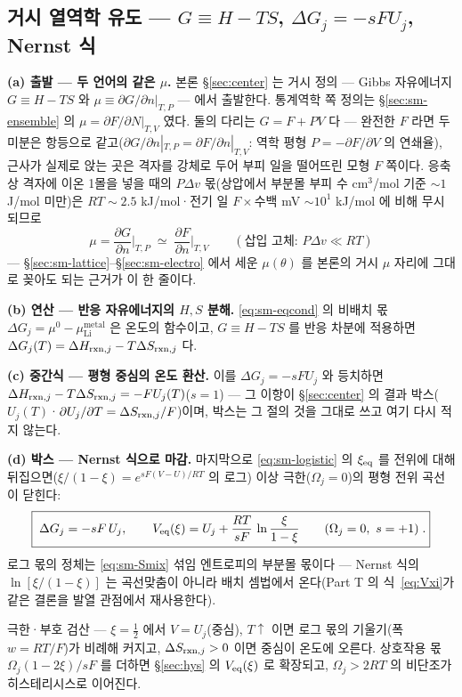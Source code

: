 \subsection{거시 열역학 유도 --- $G\equiv H-TS$, $\Delta G_j=-sFU_j$, Nernst 식}\label{sec:sm-macro}
\textbf{(a) 출발 --- 두 언어의 같은 $\mu$.} 본론 \S\ref{sec:center} 는 거시 정의 --- Gibbs 자유에너지
$G\equiv H-TS$ 와 $\mu\equiv\partial G/\partial n|_{T,P}$ --- 에서 출발한다. 통계역학 쪽 정의는
\S\ref{sec:sm-ensemble} 의 $\mu=\partial F/\partial N|_{T,V}$ 였다. 둘의 다리는 $G=F+PV$ 다 --- 완전한
$F$ 라면 두 미분은 항등으로 같고($\partial G/\partial n|_{T,P}=\partial F/\partial n|_{T,V}$: 역학 평형
$P=-\partial F/\partial V$ 의 연쇄율), 근사가 실제로 앉는 곳은 격자를 강체로 두어 부피 일을 떨어뜨린 모형
$F$ 쪽이다. 응축상 격자에 이온 1몰을 넣을 때의 $P\Delta v$ 몫(상압에서 부분몰 부피 수 cm$^3$/mol 기준
$\sim1$ J/mol 미만)은 $RT\sim2.5$ kJ/mol·전기 일 $F\times$수백 mV $\sim10^1$ kJ/mol 에 비해 무시되므로
\begin{equation}
\mu=\frac{\partial G}{\partial n}\Big|_{T,P}\;\simeq\;\frac{\partial F}{\partial n}\Big|_{T,V}
\qquad(\text{삽입 고체: }P\Delta v\ll RT)
\label{eq:sm-mubridge}
\end{equation}
--- \S\ref{sec:sm-lattice}--\S\ref{sec:sm-electro} 에서 세운 $\mu(\theta)$ 를 본론의 거시 $\mu$ 자리에
그대로 꽂아도 되는 근거가 이 한 줄이다.

\textbf{(b) 연산 --- 반응 자유에너지의 $H,S$ 분해.} \eqref{eq:sm-eqcond} 의 비배치 몫
$\Delta G_j=\mu^0-\mu_\mathrm{Li}^\mathrm{metal}$ 은 온도의 함수이고, $G\equiv H-TS$ 를 반응 차분에 적용하면
$\Delta G_j(T)=\Delta H_{\mathrm{rxn},j}-T\Delta S_{\mathrm{rxn},j}$ 다.

\textbf{(c) 중간식 --- 평형 중심의 온도 환산.}
이를 $\Delta G_j=-sFU_j$ 와 등치하면 $\Delta H_{\mathrm{rxn},j}-T\Delta S_{\mathrm{rxn},j}=-FU_j(T)$($s{=}1$) --- 그 이항이
\S\ref{sec:center} 의 결과 박스($U_j(T)$·$\partial U_j/\partial T=\Delta S_{\mathrm{rxn},j}/F$)이며, 박스는 그 절의
것을 그대로 쓰고 여기 다시 적지 않는다.

\textbf{(d) 박스 --- Nernst 식으로 마감.} 마지막으로 \eqref{eq:sm-logistic} 의 $\xi_{\mathrm{eq}}$ 를 전위에 대해
뒤집으면($\xi/(1-\xi)=e^{sF(V-U)/RT}$ 의 로그) 이상 극한($\Omega_j=0$)의 평형 전위 곡선이 닫힌다:
\begin{equation}
\boxed{\;
\Delta G_j=-sF\,U_j,
\qquad
V_{\mathrm{eq}}(\xi)=U_j+\frac{RT}{sF}\,\ln\frac{\xi}{1-\xi}
\qquad(\Omega_j=0,\ s=+1)\;.}
\label{eq:sm-nernst}
\end{equation}
로그 몫의 정체는 \eqref{eq:sm-Smix} 섞임 엔트로피의 부분몰 몫이다 --- Nernst 식의 $\ln[\xi/(1-\xi)]$ 는
곡선맞춤이 아니라 배치 셈법에서 온다(Part T 의 식~\eqref{eq:Vxi}가 같은 결론을 발열 관점에서 재사용한다).
\begin{verifybox}
극한·부호 검산 --- $\xi=\tfrac12$ 에서 $V=U_j$(중심), $T\!\uparrow$ 이면 로그 몫의 기울기(폭 $w=RT/F$)가
비례해 커지고, $\Delta S_{\mathrm{rxn},j}>0$ 이면 중심이 온도에 오른다. 상호작용 몫 $\Omega_j(1-2\xi)/sF$ 를 더하면
\S\ref{sec:hys} 의 $V_{\mathrm{eq}}(\xi)$ 로 확장되고, $\Omega_j>2RT$ 의 비단조가 히스테리시스로 이어진다.
\end{verifybox}

